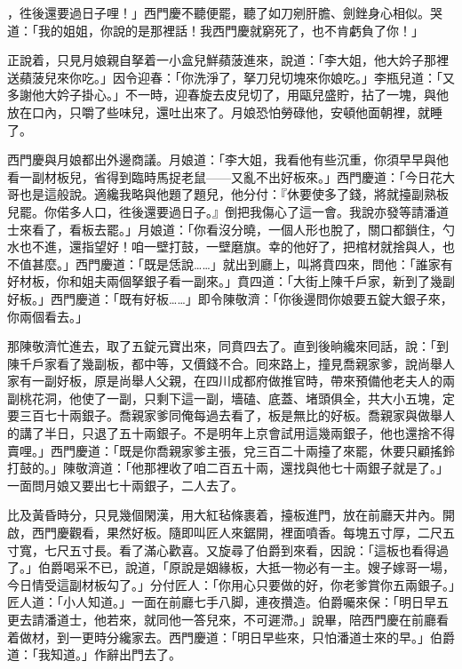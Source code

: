 ，徃後還要過日子哩！」{}西門慶不聽便罷，聽了如刀剜肝膽、劍銼身心相似。哭道：「我的姐姐，你說的是那裡話！我西門慶就窮死了，也不肯虧負了你！」

正說着，只見月娘親自拏着一小盒兒鮮蘋菠進來，說道：「李大姐，他大妗子那裡送蘋菠兒來你吃。」因令迎春：「你洗淨了，拏刀兒切塊來你娘吃。」李瓶兒道：「又多謝他大妗子掛心。」不一時，迎春旋去皮兒切了，用甌兒盛貯，拈了一塊，與他放在口內，只嚼了些味兒，還吐出來了。月娘恐怕勞碌他，安頓他面朝裡，就睡了。

西門慶與月娘都出外邊商議。月娘道：「李大姐，我看他有些沉重，你須早早與他看一副材板兒，省得到臨時馬捉老鼠——又亂不出好板來。」西門慶道：「今日花大哥也是這般說。適纔我略與他題了題兒，他分付：『休要使多了錢，將就擡副熟板兒罷。你偌多人口，徃後還要過日子。』倒把我傷心了這一會。我說亦發等請潘道士來看了，看板去罷。」{}月娘道：「你看沒分曉，一個人形也脫了，關口都鎖住，勺水也不進，還指望好！咱一壁打鼓，一壁磨旗。幸的他好了，把棺材就捨與人，也不值甚麼。」西門慶道：「既是恁說……」就出到廳上，叫將賁四來，問他：「誰家有好材板，你和姐夫兩個拏銀子看一副來。」賁四道：「大街上陳千戶家，新到了幾副好板。」西門慶道：「既有好板……」即令陳敬濟：「你後邊問你娘要五錠大銀子來，你兩個看去。」

那陳敬濟忙進去，取了五錠元寶出來，同賁四去了。直到後晌纔來囘話，說：「到陳千戶家看了幾副板，都中等，又價錢不合。囘來路上，撞見喬親家爹，說尚舉人家有一副好板，原是尚舉人父親，在四川成都府做推官時，帶來預備他老夫人的兩副桃花洞，他使了一副，只剩下這一副，墻磕、底蓋、堵頭俱全，共大小五塊，定要三百七十兩銀子。喬親家爹同俺每過去看了，板是無比的好板。喬親家與做舉人的講了半日，只退了五十兩銀子。不是明年上京會試用這幾兩銀子，他也還捨不得賣哩。」西門慶道：「既是你喬親家爹主張，兌三百二十兩擡了來罷，休要只顧搖鈴打鼓的。」陳敬濟道：「他那裡收了咱二百五十兩，還找與他七十兩銀子就是了。」一面問月娘又要出七十兩銀子，二人去了。

比及黃昏時分，只見幾個閑漢，用大紅毡條裹着，擡板進門，放在前廳天井內。開啟，西門慶觀看，果然好板。隨即叫匠人來鋸開，裡面噴香。每塊五寸厚，二尺五寸寬，七尺五寸長。看了滿心歡喜。又旋尋了伯爵到來看，因說：「這板也看得過了。」伯爵喝采不已，說道，「原說是姻緣板，大抵一物必有一主。嫂子嫁哥一場，今日情受這副材板勾了。」分付匠人：「你用心只要做的好，你老爹賞你五兩銀子。」匠人道：「小人知道。」一面在前廳七手八脚，連夜攢造。伯爵囑來保：「明日早五更去請潘道士，他若來，就同他一答兒來，不可遲滯。」說畢，陪西門慶在前廳看着做材，到一更時分纔家去。西門慶道：「明日早些來，只怕潘道士來的早。」伯爵道：「我知道。」作辭出門去了。


